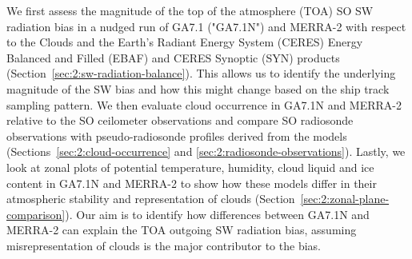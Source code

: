 We first assess the magnitude of the top of the atmosphere (TOA) SO SW radiation
bias in a nudged run of GA7.1 ("GA7.1N") and MERRA-2 with respect to the Clouds
and the Earth's Radiant Energy System (CERES) Energy Balanced and Filled (EBAF)
and CERES Synoptic (SYN) products (Section~\ref{sec:2:sw-radiation-balance}). This
allows us to identify the underlying magnitude of the SW bias and how this might
change based on the ship track sampling pattern. We then evaluate cloud
occurrence in GA7.1N and MERRA-2 relative to the SO ceilometer observations and
compare SO radiosonde observations with pseudo-radiosonde profiles derived from
the models (Sections~\ref{sec:2:cloud-occurrence} and
\ref{sec:2:radiosonde-observations}). Lastly, we look at zonal plots of potential
temperature, humidity, cloud liquid and ice content in GA7.1N and MERRA-2 to
show how these models differ in their atmospheric stability and representation
of clouds (Section~\ref{sec:2:zonal-plane-comparison}). Our aim is to identify how
differences between GA7.1N and MERRA-2 can explain the TOA outgoing SW
radiation bias, assuming misrepresentation of clouds is the major contributor
to the bias.

\begin{table}[t]
\caption[Table of voyages]{
Table of voyages. The table lists voyages analysed in this study. Listed is  the
voyage name (Voyage), which is the official name of the voyage or an
abbreviation for the purpose of this study, ship name (Ship), organisation
(Org.), start and end dates of the voyage (Start, End), number of days spent at
sea (Days), target region of the SO (Region), maximum and minimum geographical
coordinates of the voyage track (Lat., Lon.). }
\label{tab:2:voyages}
\centering
\centerline{}
\end{table}

